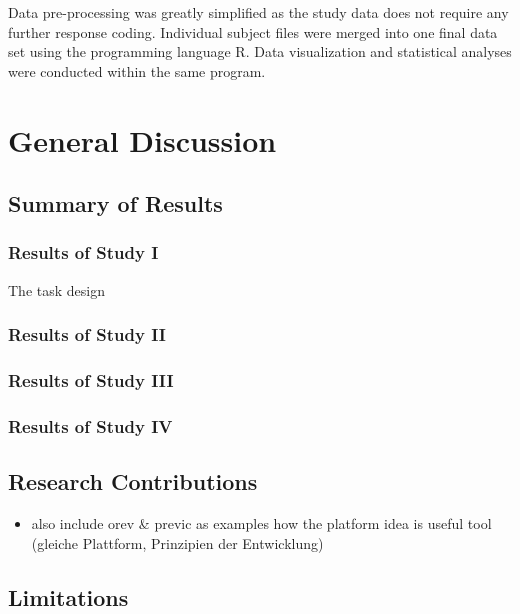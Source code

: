 \documentclass[
]{scrbook}
\providecommand{\tightlist}{%
  \setlength{\itemsep}{0pt}\setlength{\parskip}{0pt}}
\begin{document}
Data pre-processing was greatly simplified as the study data does not require any further response coding. Individual subject files were merged into one final data set using the programming language R. Data visualization and statistical analyses were conducted within the same program.

\chapter{General Discussion}\label{discussion}

\section{Summary of Results}\label{summary-of-results}

\subsection{Results of Study I}\label{resultsI}

The task design

\subsection{Results of Study II}\label{resultsII}

\subsection{Results of Study III}\label{resultsIII}

\subsection{Results of Study IV}\label{resultsIV}

\section{Research Contributions}\label{research-contributions}

\begin{itemize}
\tightlist
\item
  also include orev \& previc as examples how the platform idea is useful tool (gleiche Plattform, Prinzipien der Entwicklung)
\end{itemize}

\section{Limitations}\label{limitations}
\end{document}
